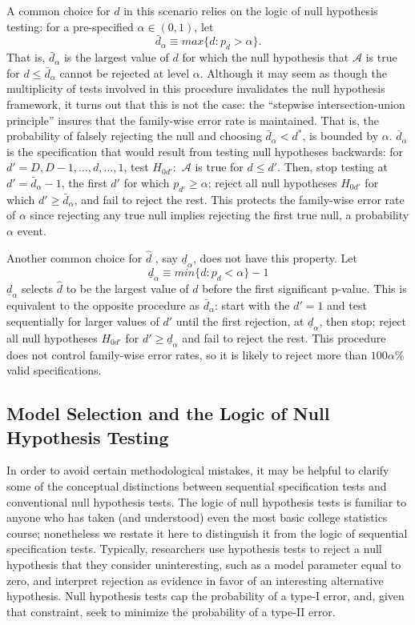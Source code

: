 \documentclass[lineno]{biometrika}\usepackage[]{graphicx}\usepackage[]{color}
\newcommand{\dalphaU}{\bar{d}_\alpha}
\newcommand{\dalphaB}{\underline{d}_\alpha}
\newcommand{\dstar}{d^*}
\begin{document}
A common choice for $d$ in this scenario relies on the logic of null
hypothesis testing: for a pre-specified $\alpha \in (0,1)$, let
\begin{equation*}
\dalphaU \equiv max\{d : p_d>\alpha\}.
\end{equation*}
That is, $\dalphaU$ is the largest value of $d$ for which the
null hypothesis that $\mathcal{A}$ is true for $d\le \dalphaU$
cannot be rejected at level $\alpha$.
Although it may seem as though the multiplicity of tests involved in
this procedure invalidates the null hypothesis framework, it turns out
that this is not the case: the ``stepwise intersection-union
principle'' \citet{berger1988, rosenbaum2008,hansen2015} insures that the
family-wise error rate is maintained.
That is, the probability of falsely rejecting the null and choosing
$\dalphaU<\dstar$, is bounded by $\alpha$.
$\dalphaU$ is the specification that would result from testing null
hypotheses backwards: for $d'=D,D-1,\dots,d,\dots,1$, test $H_{0d'}:$
$\mathcal{A}$ is true for $d\le d'$.
Then, stop testing at $d'=\dalphaU -1$, the first $d'$ for which
$p_{d'} \ge \alpha$; reject all null hypotheses $H_{0d'}$ for which
$d'\ge \dalphaU$, and fail to reject the rest.
This protects the family-wise error rate of $\alpha$ since rejecting
any true null implies rejecting the first true null, a
probability $\alpha$ event.

Another common choice for $\hat{d}$  \citep[e.g.][]{lutkepohl2005new}, say $\dalphaB$,
does not have this property.
Let
\begin{equation*}
\dalphaB\equiv min\{d: p_d<\alpha\}-1
\end{equation*}
$\dalphaB$ selects $\hat{d}$ to be the largest value of $d$ before the first
significant p-value.
This is equivalent to the opposite procedure as $\dalphaU$: start with the $d'=1$
and test sequentially for larger values of $d'$ until the first
rejection, at $\dalphaB$, then stop; reject all null
hypotheses $H_{0d'}$ for $d'\ge \dalphaB$ and fail to
reject the rest.
This procedure does not control family-wise error rates, so it is likely
to reject more than $100\alpha$\% valid specifications.


\subsection{Model Selection and the Logic of Null Hypothesis Testing}
In order to avoid certain methodological mistakes, it may be helpful to
clarify some of the conceptual distinctions between sequential specification tests and
conventional null hypothesis tests.
The logic of null hypothesis tests is familiar to anyone who has taken (and understood)
even the most basic college statistics course; nonetheless we restate
it here to distinguish it from the logic of sequential specification tests.
Typically, researchers use hypothesis tests to reject a null hypothesis that they
consider uninteresting, such as a model parameter equal to zero, and
interpret rejection as evidence in favor of an
interesting alternative hypothesis.
Null hypothesis tests cap the probability of a type-I error, and, given that constraint, seek to minimize the
probability of a type-II error.
\end{document}
